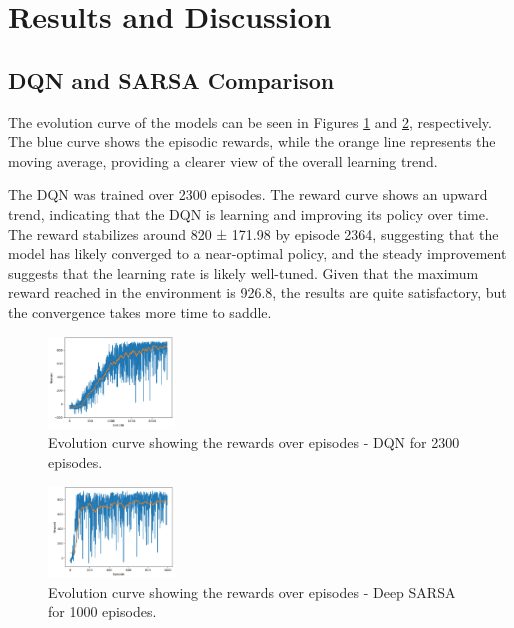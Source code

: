 \documentclass[../CSC_52081_EP.tex]{subfiles}
\begin{document}
\section{Results and Discussion}

\subsection{DQN and SARSA Comparison}

The evolution curve of the models can be seen in Figures \ref{fig:DQN_evolution} and \ref{fig:SARSA_evolution}, respectively. The blue curve shows the episodic rewards, while the orange line represents the moving average, providing a clearer view of the overall learning trend.

The DQN was trained over 2300 episodes. The reward curve shows an upward trend, indicating that the DQN is learning and improving its policy over time. The reward stabilizes around 820 ± 171.98 by episode 2364, suggesting that the model has likely converged to a near-optimal policy, and the steady improvement suggests that the learning rate is likely well-tuned. Given that the maximum reward reached in the environment is 926.8, the results are quite satisfactory, but the convergence takes more time to saddle.

\begin{figure}[H]
    \centering
    \includegraphics[width=0.3\textwidth]{figures/DQN_train_2364.png}
    \caption{Evolution curve showing the rewards over episodes - DQN for 2300 episodes.}
    \label{fig:DQN_evolution}
\end{figure}


\begin{figure}[H]
    \centering
    \includegraphics[width=0.3\textwidth]{figures/SARSA_train.png}
    \caption{Evolution curve showing the rewards over episodes - Deep SARSA for 1000 episodes.}
    \label{fig:SARSA_evolution}
\end{figure}
\end{document}
